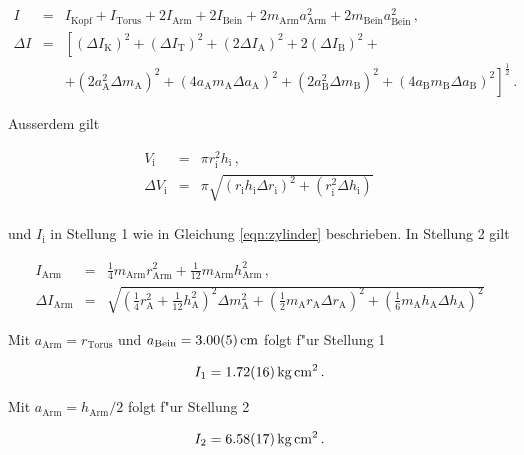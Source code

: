 				\begin{eqnarray*}
					I & = & I_\mathrm{Kopf} + I_\mathrm{Torus} + 2 I_\mathrm{Arm} + 2 I_\mathrm{Bein} + 2 m_\mathrm{Arm}a_\mathrm{Arm}^2 + 2 m_\mathrm{Bein}a_\mathrm{Bein}^2 \,, \\
					\Delta I & = & \left[(\Delta I_\mathrm{K})^2 + (\Delta I_\mathrm{T})^2 + (2 \Delta I_\mathrm{A})^2 + 2(\Delta I_\mathrm{B})^2 +\right. \\
					&& \left. + (2a_\mathrm{A}^2 \Delta m_\mathrm{A})^2 + (4 a_\mathrm{A}m_\mathrm{A} \Delta a_\mathrm{A})^2 + (2a_\mathrm{B}^2 \Delta m_\mathrm{B})^2 + (4 a_\mathrm{B}m_\mathrm{B} \Delta a_\mathrm{B})^2\right]^\frac{1}{2} \,.
				\end{eqnarray*}

				Ausserdem gilt

				\begin{eqnarray*}
					V_\mathrm{i} & = & \pi r_\mathrm{i}^2 h_\mathrm{i} \,, \\
					\Delta V_\mathrm{i} & = & \pi \sqrt{(r_\mathrm{i} h_\mathrm{i} \Delta r_\mathrm{i})^2 + (r_\mathrm{i}^2 \Delta h_\mathrm{i})} \, \\
				\end{eqnarray*}

				und $I_\mathrm{i}$ in Stellung 1 wie in Gleichung \eqref{eqn:zylinder} beschrieben. In Stellung 2 gilt

				\begin{eqnarray*}
					I_\mathrm{Arm} & = & \frac{1}{4}m_\mathrm{Arm}r_\mathrm{Arm}^2 + \frac{1}{12}m_\mathrm{Arm}h_\mathrm{Arm}^2 \,, \\
					\Delta I_\mathrm{Arm} & = & \sqrt{\left(\frac{1}{4}r_\mathrm{A}^2 + \frac{1}{12}h_\mathrm{A}^2\right)^2 \Delta m_\mathrm{A}^2 + \left(\frac{1}{2}m_\mathrm{A}r_\mathrm{A}\Delta r_\mathrm{A}\right)^2 + \left(\frac{1}{6}m_\mathrm{A}h_\mathrm{A}\Delta h_\mathrm{A}\right)^2}
				\end{eqnarray*}

				Mit $a_\mathrm{Arm} = r_\mathrm{Torus}$ und $a_\mathrm{Bein} = \SI{3.00 (5)}{\centi \meter}$ folgt f"ur Stellung 1

				\begin{equation*}
					I_1 = \SI{1.72 (16)}{\kilo \gram \centi \meter \squared} \,.
				\end{equation*}

				Mit $a_\mathrm{Arm} = h_\mathrm{Arm} / 2$ folgt f"ur Stellung 2

				\begin{equation*}
					I_2 = \SI{6.58 (17)}{\kilo \gram \centi \meter \squared} \,.
				\end{equation*}

